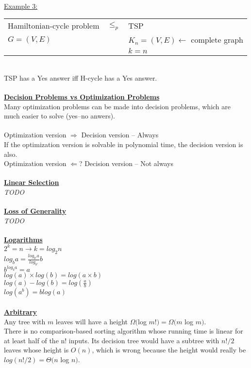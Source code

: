\documentclass[8pt,letterpaper,twocolumn]{article}
\begin{document}
\\
\underline{Example 3:}\\
\begin{tabular}{ l c l }
Hamiltonian-cycle problem & $\leq_p$ & TSP\\
$G=(V,E)$& & $K_n=(V,E) \leftarrow$ complete graph\\
& & $k=n$\\
\end{tabular}\\
TSP has a Yes answer iff H-cycle has a Yes answer.\\
\\
\underline{\textbf{Decision Problems vs Optimization Problems}}\\
Many optimization problems can be made into decision problems, which are much easier to solve (yes--no anwers).\\
\\
Optimization version $\Rightarrow$ Decision version -- Always\\
If the optimization version is solvable in polynomial time, the decision version is also.\\
Optimization version $\Leftarrow$? Decision version -- Not always\\
\\
\underline{\textbf{Linear Selection}}\\
\emph{TODO}\\
\\
\underline{\textbf{Loss of Generality}}\\
\emph{TODO}\\
\\
\underline{\textbf{Logarithms}}\\
$2^k = n \rightarrow k = log_2n$\\
$log_ba = \frac{log_{b'}a}{log_{b'}}b$\\
$b^{log_ba}=a$\\
$log(a) \times log(b) = log(a \times b)$\\
$log(a) - log(b) = log(\frac{a}{b})$\\
$log(a^b) = b log(a)$\\
\\
\underline{\textbf{Arbitrary}}\\
\textbullet Any tree with $m$ leaves will have a height $\Omega($log $m!) = \Omega(m$ log $m)$.\\
There is no comparison-based sorting algorithm whose running time is linear for at least half of the n! inputs.
Its decision tree would have a subtree with $n!/2$ leaves whose height is $O(n)$, which is wrong because the height would really be $log(n!/2) = \Theta(n$ log $n)$.\\
\end{document}
